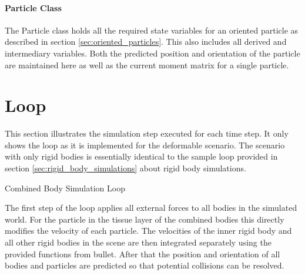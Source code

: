 \paragraph{Particle Class}
The Particle class holds all the required state variables for an oriented particle as described in section \ref{sec:oriented_particles}. This also includes all derived and intermediary variables. Both the predicted position and orientation of the particle are maintained here as well as the current moment matrix for a single particle.

\section{Loop}

This section illustrates the simulation step executed for each time step. It only shows the loop as it is implemented for the deformable scenario. The scenario with only rigid bodies is essentially identical to the sample loop provided in section \ref{sec:rigid_body_simulations} about rigid body simulations.

\begin{algorithm}[htb!]
\caption{Combined Body Simulation Loop}
\begin{algorithmic}[1]
\ENDFOR
{}
	\ENDFOR
	\ENDFOR
\ENDFOR
{}
		\ENDFOR
	\ENDFOR
\ENDFOR
{}
	\ENDFOR
\ENDFOR
{}
\ENDFOR

\ENDFOR
\end{algorithmic}
\end{algorithm}

The first step of the loop applies all external forces to all bodies in the simulated world. For the particle in the tissue layer of the combined bodies this directly modifies the velocity of each particle. The velocities of the inner rigid body and all other rigid bodies in the scene are then integrated separately using the provided functions from bullet. After that the position and orientation of all bodies and particles are predicted so that potential collisions can be resolved.

